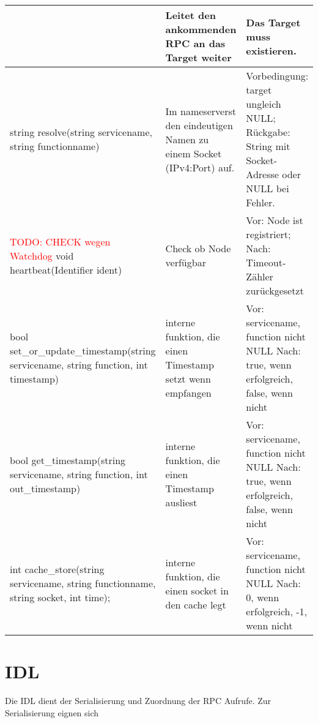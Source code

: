 \begin{longtable}{|>{\raggedright\arraybackslash}p{4cm}|>{\raggedright\arraybackslash}p{5cm}|>{\raggedright\arraybackslash}p{5cm}|}
	& Leitet den ankommenden RPC an das Target weiter
	& Das Target muss existieren.
	\\
	\hline
	string resolve(string servicename, string functionname)
	& Im nameserverst den eindeutigen Namen zu einem Socket (IPv4:Port) auf.
	& Vorbedingung: target ungleich NULL; Rückgabe: String mit Socket-Adresse oder NULL bei Fehler.
	\\
	\hline
	\textcolor{red}{TODO: CHECK wegen Watchdog} void heartbeat(Identifier ident)	
	& Check ob Node verfügbar	
	& Vor: Node ist registriert; Nach: Timeout-Zähler zurückgesetzt
	\\
	\hline
	bool set\_or\_update\_timestamp(string servicename, string function, int timestamp)
	&interne funktion, die einen Timestamp setzt wenn empfangen
	& Vor: servicename, function nicht NULL Nach: true, wenn erfolgreich, false, wenn nicht
	\\
	\hline
	bool get\_timestamp(string servicename, string function, int out\_timestamp)
	&interne funktion, die einen Timestamp ausliest
	& Vor: servicename, function nicht NULL Nach: true, wenn erfolgreich, false, wenn nicht
	\\
	\hline
	int cache\_store(string servicename, string functionname, string socket, int time);
	& interne funktion, die einen socket in den cache legt
	& Vor: servicename, function nicht NULL Nach: 0, wenn erfolgreich, -1, wenn nicht
\end{longtable}






\section{IDL}

Die IDL dient der Serialisierung und Zuordnung der RPC Aufrufe. Zur Serialisierung eignen sich 
